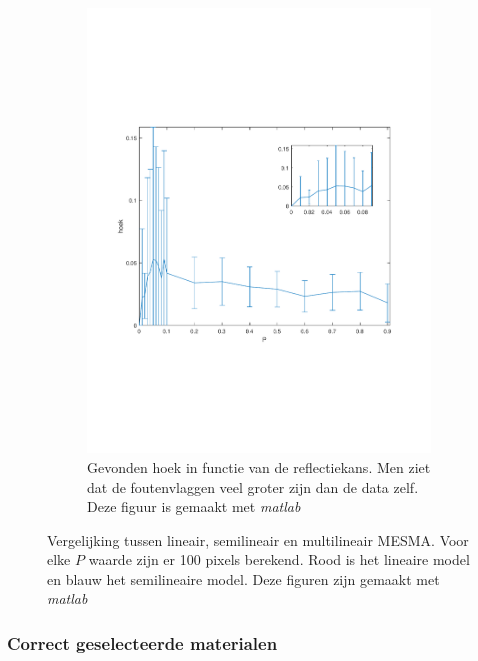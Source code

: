 \documentclass[12pt]{report}
\begin{document}
\begin{figure}
\begin{subfigure}[b]{0.5\textwidth}
\includegraphics[width=\textwidth,trim=0 200 0 175 cm]{PMC_10_100_angle.pdf}
\caption{Gevonden hoek in functie van de reflectiekans. Men ziet dat de foutenvlaggen veel groter zijn dan de data zelf. Deze figuur is gemaakt met \textit{matlab}\cite{matlab} \label{fig:hoek}}
\end{subfigure}
\caption{Vergelijking tussen lineair, semilineair en multilineair MESMA. Voor elke $P$ waarde zijn er 100 pixels berekend. Rood is het lineaire model en blauw het semilineaire model. Deze figuren zijn gemaakt met \textit{matlab}\cite{matlab}\label{fig:b100}}
\end{figure}

\subsubsection{Correct geselecteerde materialen}
\end{document}
